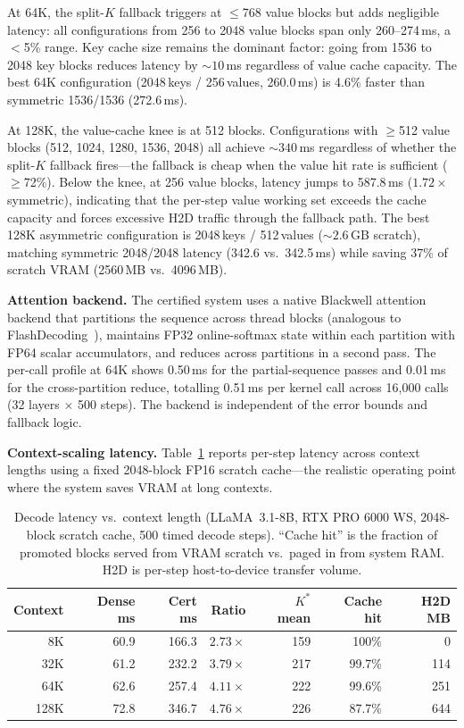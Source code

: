 \documentclass[11pt,a4paper]{article}
\theoremstyle{definition}
\theoremstyle{remark}
\begin{document}
At 64K, the split-$K$ fallback triggers at $\leq$768 value blocks but adds negligible latency: all configurations from 256 to 2048 value blocks span only 260--274\,ms, a $<$5\% range.  Key cache size remains the dominant factor: going from 1536 to 2048 key blocks reduces latency by ${\sim}10$\,ms regardless of value cache capacity.  The best 64K configuration (2048\,keys / 256\,values, 260.0\,ms) is 4.6\% faster than symmetric 1536/1536 (272.6\,ms).

At 128K, the value-cache knee is at 512 blocks.  Configurations with $\geq$512 value blocks (512, 1024, 1280, 1536, 2048) all achieve ${\sim}340$\,ms regardless of whether the split-$K$ fallback fires---the fallback is cheap when the value hit rate is sufficient ($\geq$72\%).  Below the knee, at 256 value blocks, latency jumps to 587.8\,ms ($1.72\times$ symmetric), indicating that the per-step value working set exceeds the cache capacity and forces excessive H2D traffic through the fallback path.  The best 128K asymmetric configuration is 2048\,keys / 512\,values (${\sim}2.6$\,GB scratch), matching symmetric 2048/2048 latency (342.6 vs.\ 342.5\,ms) while saving 37\% of scratch VRAM (2560\,MB vs.\ 4096\,MB).

\textbf{Attention backend.}  The certified system uses a native Blackwell attention backend that partitions the sequence across thread blocks (analogous to FlashDecoding~\cite{flashinfer}), maintains FP32 online-softmax state within each partition with FP64 scalar accumulators, and reduces across partitions in a second pass.  The per-call profile at 64K shows 0.50\,ms for the partial-sequence passes and 0.01\,ms for the cross-partition reduce, totalling 0.51\,ms per kernel call across 16{,}000 calls (32 layers $\times$ 500 steps).  The backend is independent of the error bounds and fallback logic.

\textbf{Context-scaling latency.}  Table~\ref{tab:context_scaling} reports per-step latency across context lengths using a fixed 2048-block FP16 scratch cache---the realistic operating point where the system saves VRAM at long contexts.

\begin{table}[H]
\centering
\caption{Decode latency vs.\ context length (LLaMA~3.1-8B, RTX PRO 6000 WS, 2048-block scratch cache, 500 timed decode steps).  ``Cache hit'' is the fraction of promoted blocks served from VRAM scratch vs.\ paged in from system RAM\@.  H2D is per-step host-to-device transfer volume.}
\label{tab:context_scaling}
\small
\begin{tabular}{rrrrrrr}
\toprule
\textbf{Context} & \textbf{Dense ms} & \textbf{Cert ms} & \textbf{Ratio} & \textbf{$K^*$ mean} & \textbf{Cache hit} & \textbf{H2D MB} \\
\midrule
8K   & 60.9 & 166.3  & $2.73\times$ & 159 & 100\%  & 0 \\
32K  & 61.2 & 232.2  & $3.79\times$ & 217 & 99.7\% & 114 \\
64K  & 62.6 & 257.4  & $4.11\times$ & 222 & 99.6\% & 251 \\
128K & 72.8 & 346.7  & $4.76\times$ & 226 & 87.7\% & 644 \\
\bottomrule
\end{tabular}
\end{table}
\end{document}
